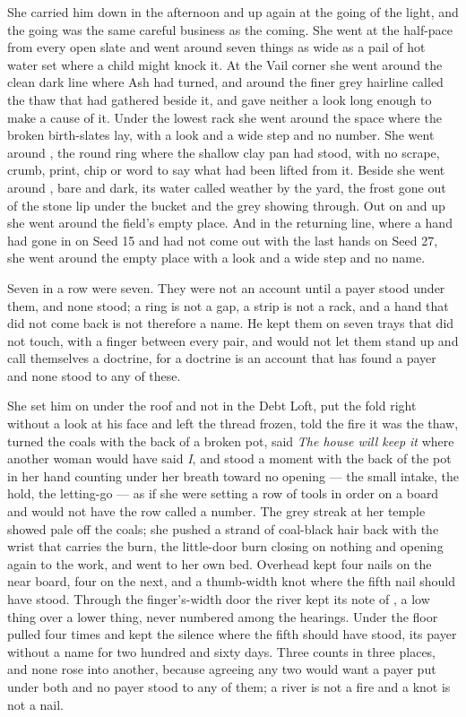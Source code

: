 She carried him down in the afternoon and up again at the going of the light, and the going was the same careful business as the coming. She went at the half-pace from every open slate and went around seven things as wide as a pail of hot water set where a child might knock it. At the Vail corner she went around the clean dark line where Ash had turned, and around the finer grey hairline called the thaw that had gathered beside it, and gave neither a look long enough to make a cause of it. Under the lowest rack she went around the space where the broken birth-slates lay, with a look and a wide step and no number. She went around , the round ring where the shallow clay pan had stood, with no scrape, crumb, print, chip or word to say what had been lifted from it. Beside  she went around , bare and dark, its water called weather by the yard, the frost gone out of the stone lip under the bucket and the grey showing through. Out on  and up  she went around the field's empty place. And in the returning line, where a hand had gone in on Seed 15 and had not come out with the last hands on Seed 27, she went around the empty place with a look and a wide step and no name.

Seven in a row were seven. They were not an account until a payer stood under them, and none stood; a ring is not a gap, a strip is not a rack, and a hand that did not come back is not therefore a name. He kept them on seven trays that did not touch, with a finger between every pair, and would not let them stand up and call themselves a doctrine, for a doctrine is an account that has found a payer and none stood to any of these.

She set him on  under the roof and not in the Debt Loft, put the fold right without a look at his face and left the thread frozen, told the fire it was the thaw, turned the coals with the back of a broken pot, said \emph{The house will keep it} where another woman would have said \emph{I}, and stood a moment with the back of the pot in her hand counting under her breath toward no opening --- the small intake, the hold, the letting-go --- as if she were setting a row of tools in order on a board and would not have the row called a number. The grey streak at her temple showed pale off the coals; she pushed a strand of coal-black hair back with the wrist that carries the burn, the little-door burn closing on nothing and opening again to the work, and went to her own bed. Overhead  kept four nails on the near board, four on the next, and a thumb-width knot where the fifth nail should have stood. Through the finger's-width door the river kept its note of , a low thing over a lower thing, never numbered among the hearings. Under the floor  pulled four times and kept the silence where the fifth should have stood, its payer without a name for two hundred and sixty days. Three counts in three places, and none rose into another, because agreeing any two would want a payer put under both and no payer stood to any of them; a river is not a fire and a knot is not a nail.

